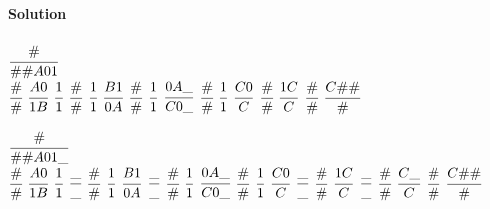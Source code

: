 \documentclass{article}
\newcommand{\domino}[2]{\cfrac{#1}{#2}}
\begin{document}
\textbf{Solution} \\ \\
\begin{adjustbox}{width=1.0\textwidth,center}
$\domino{\#}{\#\#A01}$ \\
$\domino{\#}{\#}$
$\domino{A0}{1B}$
$\domino{1}{1}$
$\domino{\#}{\#}$
$\domino{1}{1}$
$\domino{B1}{0A}$
$\domino{\#}{\#}$
$\domino{1}{1}$
$\domino{0A\_}{C0\_}$
$\domino{\#}{\#}$
$\domino{1}{1}$
$\domino{C0}{C}$ 
$\domino{\#}{\#}$
$\domino{1C}{C}$ 
$\domino{\#}{\#}$
$\domino{C\#\#}{\#}$ \\
\end{adjustbox}

\vspace{1cm}

\begin{adjustbox}{width=1.1\textwidth,center}
$\domino{\#}{\#\#A01\_}$ \\
$\domino{\#}{\#}$
$\domino{A0}{1B}$
$\domino{1}{1}$
$\domino{\_}{\_}$
$\domino{\#}{\#}$
$\domino{1}{1}$
$\domino{B1}{0A}$
$\domino{\_}{\_}$
$\domino{\#}{\#}$
$\domino{1}{1}$
$\domino{0A\_}{C0\_}$
$\domino{\#}{\#}$
$\domino{1}{1}$
$\domino{C0}{C}$ 
$\domino{\_}{\_}$
$\domino{\#}{\#}$
$\domino{1C}{C}$ 
$\domino{\_}{\_}$
$\domino{\#}{\#}$
$\domino{C\_}{C}$
$\domino{\#}{\#}$
$\domino{C\#\#}{\#}$ \\
\end{adjustbox}





\end{document}

